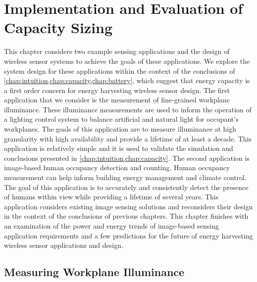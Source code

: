 \chapter{Implementation and Evaluation of Capacity Sizing}
\label{chap:permacam}

This chapter considers two example sensing applications and the design of wireless sensor systems to achieve the goals of these applications.
We explore the system design for these applications within the context of the conclusions of \cref{chap:intuition,chap:capacity,chap:battery}, which suggest that energy capacity is a first order concern for energy harvesting wireless sensor design.
The first application that we consider is the measurement of fine-grained workplane illuminance. These illuminance measurements are used to inform the operation of a lighting control system to balance artificial and natural light for occupant's workplanes. 
The goals of this application are to measure illuminance at high granularity with high availability and provide a lifetime of at least a decade. 
This application is relatively simple and it is used to validate the simulation and conclusions presented in \cref{chap:intuition,chap:capacity}.
The second application is image-based human occupancy detection and counting. 
Human occupancy measurement can help inform building energy management and climate control.
The goal of this application is to accurately and consistently detect the presence of humans within view while providing a lifetime of several years.
This application considers existing image sensing solutions and reconsiders their design in the context of the conclusions of previous chapters.
This chapter finishes with an examination of the power and energy trends of image-based sensing application requirements and a few predictions for the future of energy harvesting wireless sensor applications and design. 

\section{Measuring Workplane Illuminance}
\label{sec:impl:permamote}



